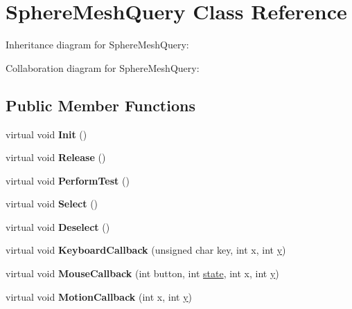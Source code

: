 \hypertarget{class_sphere_mesh_query}{\section{Sphere\+Mesh\+Query Class Reference}
\label{class_sphere_mesh_query}
}


Inheritance diagram for Sphere\+Mesh\+Query\+:


Collaboration diagram for Sphere\+Mesh\+Query\+:
\subsection*{Public Member Functions}
\begin{DoxyCompactItemize}
\item 
\hypertarget{class_sphere_mesh_query_a9fb6901044fb6d19f8c6160f285295a3}{virtual void {\bfseries Init} ()}\label{class_sphere_mesh_query_a9fb6901044fb6d19f8c6160f285295a3}

\item 
\hypertarget{class_sphere_mesh_query_ab7fe5ed616e42a5812f36c1821b79b94}{virtual void {\bfseries Release} ()}\label{class_sphere_mesh_query_ab7fe5ed616e42a5812f36c1821b79b94}

\item 
\hypertarget{class_sphere_mesh_query_a5fa60d1d0c51a3921971edaaa6c54fc9}{virtual void {\bfseries Perform\+Test} ()}\label{class_sphere_mesh_query_a5fa60d1d0c51a3921971edaaa6c54fc9}

\item 
\hypertarget{class_sphere_mesh_query_a14cdca6d33521ada7b05ee96fcb2c4e6}{virtual void {\bfseries Select} ()}\label{class_sphere_mesh_query_a14cdca6d33521ada7b05ee96fcb2c4e6}

\item 
\hypertarget{class_sphere_mesh_query_a41da2be13b4b1fc42e9b4556d0645553}{virtual void {\bfseries Deselect} ()}\label{class_sphere_mesh_query_a41da2be13b4b1fc42e9b4556d0645553}

\item 
\hypertarget{class_sphere_mesh_query_a3bec47671b9e7328f39712ccf6d3d4f2}{virtual void {\bfseries Keyboard\+Callback} (unsigned char key, int x, int \hyperlink{_ice_utils_8h_aa7ffaed69623192258fb8679569ff9ba}{y})}\label{class_sphere_mesh_query_a3bec47671b9e7328f39712ccf6d3d4f2}

\item 
\hypertarget{class_sphere_mesh_query_a81a08a9fe71300af9bf34b20b7650ed5}{virtual void {\bfseries Mouse\+Callback} (int button, int \hyperlink{structstate}{state}, int x, int \hyperlink{_ice_utils_8h_aa7ffaed69623192258fb8679569ff9ba}{y})}\label{class_sphere_mesh_query_a81a08a9fe71300af9bf34b20b7650ed5}

\item 
\hypertarget{class_sphere_mesh_query_aa6324d044264e99a0bc4a36b76e55102}{virtual void {\bfseries Motion\+Callback} (int x, int \hyperlink{_ice_utils_8h_aa7ffaed69623192258fb8679569ff9ba}{y})}\label{class_sphere_mesh_query_aa6324d044264e99a0bc4a36b76e55102}

\end{DoxyCompactItemize}
